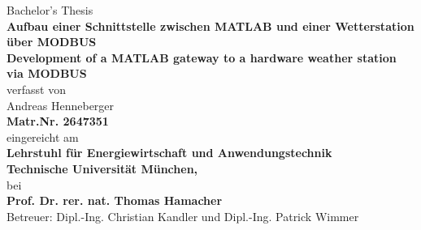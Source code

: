 \begin{titlepage}
\begin{center}
\huge{Bachelor's Thesis}\vspace{0.5cm}\\
\Huge{\textbf{Aufbau einer Schnittstelle zwischen MATLAB und einer Wetterstation über MODBUS\\ Development of a MATLAB gateway to a hardware weather station via MODBUS}}\vspace{0.5cm}\\
verfasst von\vspace{0.5cm}\\
Andreas Henneberger\\
\textbf{Matr.Nr. 2647351}\vspace{0.5cm}\\
eingereicht am\vspace{0.25cm}\\
\huge{\textbf{Lehrstuhl für Energiewirtschaft und Anwendungstechnik\\Technische Universität München,}}\vspace{0.25cm}\\
bei\vspace{0.25cm}\\
\textbf{Prof. Dr. rer. nat. Thomas Hamacher}\vspace{0.5cm}\\
Betreuer: Dipl.-Ing. Christian Kandler und Dipl.-Ing. Patrick Wimmer
\end{center}



\end{titlepage}
